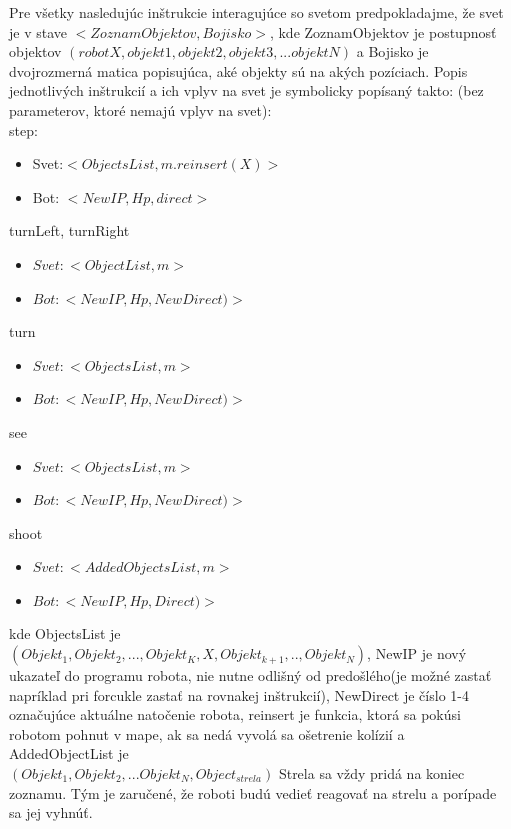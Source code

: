 Pre všetky nasledujúc inštrukcie interagujúce so svetom predpokladajme, že svet je v stave $<ZoznamObjektov, Bojisko>$, kde ZoznamObjektov je postupnosť objektov $(robot X, objekt1, objekt2, objekt3,...objektN)$ a Bojisko je dvojrozmerná matica popisujúca, aké objekty sú na akých pozíciach.
Popis jednotlivých inštrukcií a ich vplyv na svet je symbolicky popísaný takto: (bez parameterov, ktoré nemajú vplyv na svet):\\
\newline
step:\begin {itemize}
\item Svet:$ < ObjectsList, m.reinsert(X) > $
\item Bot: $ < NewIP, Hp, direct> $
\end {itemize}
turnLeft, turnRight \begin{itemize}
\item $Svet:  <ObjectList, m>$
\item $Bot:  < NewIP, Hp, NewDirect)>$
\end{itemize}
turn  \begin{itemize}
\item $Svet:  < ObjectsList, m > $
\item $Bot:   < NewIP, Hp, NewDirect)> $
\end {itemize}
see  \begin{itemize}
\item $Svet:  <ObjectsList,m> $
\item $ Bot:  < NewIP, Hp, NewDirect)> $
\end {itemize}
shoot \begin {itemize}
\item $ Svet:  < AddedObjectsList, m> $ 
\item $ Bot:  < NewIP, Hp, Direct)>  $
\end {itemize}
\indent
kde ObjectsList je \\ $(Objekt_1, Objekt_2, ..., Objekt_K, X, Objekt_{k+1},.., Objekt_N)$, NewIP je nový ukazateľ do programu robota, nie nutne odlišný od predošlého(je možné zastať napríklad pri forcukle zastať na rovnakej inštrukcií), NewDirect je číslo 1-4 označujúce aktuálne natočenie robota, reinsert je funkcia, ktorá sa pokúsi robotom pohnut v mape, ak sa nedá vyvolá sa ošetrenie kolízií a AddedObjectList je\\ $(Objekt_1, Objekt_2, ... Objekt_N, Object_{strela})$ Strela sa vždy pridá na koniec zoznamu. Tým je zaručené, že roboti budú vedieť reagovať na strelu a porípade sa jej vyhnúť. %
